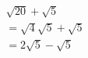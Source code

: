 \documentclass[preview]{standalone}
\begin{document}
\begin{align*}
\sqrt{20} + \sqrt{5} \\= \sqrt{4}\sqrt{5} + \sqrt{5}\\= 2\sqrt{5} - \sqrt{5}
\end{align*}
\end{document}
